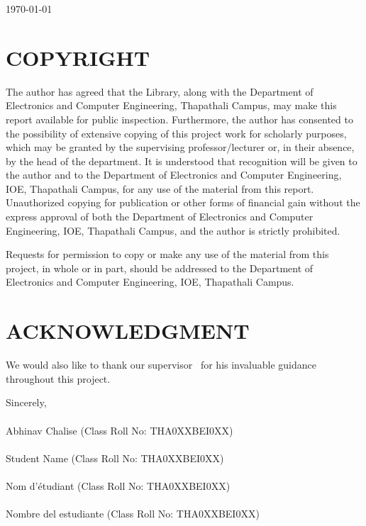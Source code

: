 \documentclass{ioereport}
\begin{document}
    \today

    \pagebreak

\section*{COPYRIGHT}
    The author has agreed that the Library, along with the Department of Electronics and Computer Engineering, Thapathali Campus, may make this report available for public inspection. Furthermore, the author has consented to the possibility of extensive copying of this project work for scholarly purposes, which may be granted by the supervising professor/lecturer or, in their absence, by the head of the department. It is understood that recognition will be given to the author and to the Department of Electronics and Computer Engineering, IOE, Thapathali Campus, for any use of the material from this report. Unauthorized copying for publication or other forms of financial gain without the express approval of both the Department of Electronics and Computer Engineering, IOE, Thapathali Campus, and the author is strictly prohibited.

    Requests for permission to copy or make any use of the material from this project, in whole or in part, should be addressed to the Department of Electronics and Computer Engineering, IOE, Thapathali Campus.

    \pagebreak

\section*{ACKNOWLEDGMENT}
    \lipsum[1]

    We would also like to thank our supervisor \supervisorname\ for his invaluable guidance throughout this project.
    
    \lipsum[2]

    Sincerely, \\ \\
    Abhinav Chalise (Class Roll No: THA0XXBEI0XX) \\ \\
    Student Name (Class Roll No: THA0XXBEI0XX) \\ \\ 
    Nom d'étudiant (Class Roll No: THA0XXBEI0XX) \\ \\ 
    Nombre del estudiante (Class Roll No: THA0XXBEI0XX) \\ 
\end{document}
